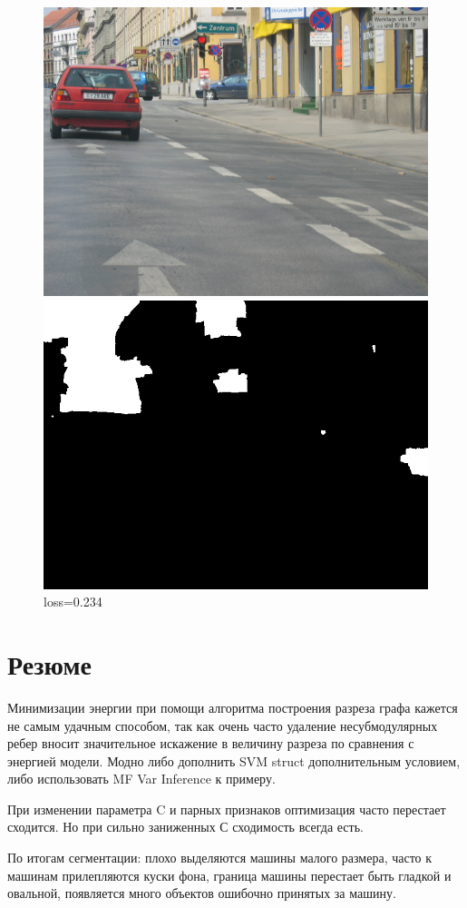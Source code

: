 \documentclass[russian,10pt,a4paper]{article}
\theoremstyle{definition}
\begin{document}
\begin{figure}[!h]
  \center
    \includegraphics[width=0.45\linewidth]{images/imgTrain_147}$ $
    \includegraphics[width=0.45\linewidth]{images/147_segm_res}
loss=0.234
\end{figure}


\newpage






\section{Резюме}

Минимизации энергии при помощи алгоритма построения разреза графа
кажется не самым удачным способом, так как очень часто удаление несубмодулярных ребер вносит значительное искажение в величину разреза по сравнения с энергией модели. Модно либо дополнить SVM struct дополнительным условием, либо использовать  MF Var Inference к примеру. 

При изменении параметра C и парных признаков оптимизация часто перестает сходится. Но при сильно заниженных С сходимость всегда есть.

По итогам сегментации: плохо выделяются машины малого размера, часто к машинам прилепляются куски фона, граница машины перестает быть гладкой и овальной, появляется много объектов ошибочно принятых за машину.  
       
\end{document}
